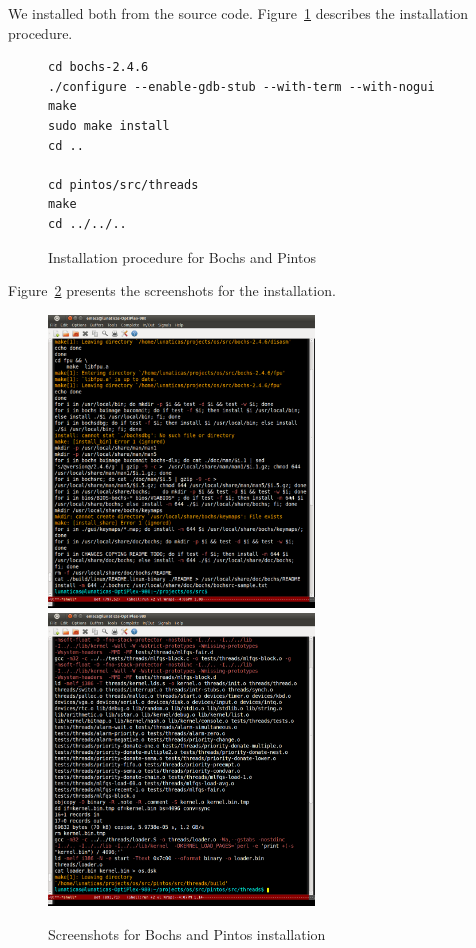 \documentclass[a4paper,article,11pt,oneside]{article}
\begin{document}
We installed both from the source code. Figure~\ref{figinstall}
describes the installation procedure.
\begin{figure}
\begin{verbatim}
cd bochs-2.4.6
./configure --enable-gdb-stub --with-term --with-nogui
make
sudo make install
cd ..

cd pintos/src/threads
make
cd ../../..
\end{verbatim}
\caption{Installation procedure for Bochs and Pintos}\label{figinstall}
\end{figure}

Figure~\ref{figscreenshot} presents the screenshots for the
installation.
\begin{figure}
\includegraphics[width=200pt]{bochs.png}
\includegraphics[width=200pt]{pintos.png}
\caption{Screenshots for Bochs and Pintos installation}\label{figscreenshot}
\end{figure}
\end{document}

